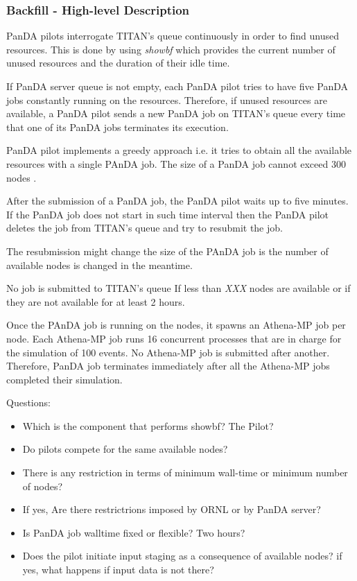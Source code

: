 \subsubsection{Backfill - High-level Description}
PanDA pilots  interrogate TITAN's queue continuously in order to find unused resources. This is done by using \emph{showbf} which provides the current number of unused resources and the duration of their idle time.

If PanDA server queue is not empty, each PanDA pilot tries to have five PanDA jobs constantly running on the resources. Therefore, if unused resources are available, a PanDA pilot sends a new PanDA job on TITAN's queue every time that one of its PanDA jobs terminates its execution.

PanDA pilot implements a greedy approach i.e. it tries to obtain all the available resources with a single PAnDA job. The size of a PanDA job cannot exceed 300 nodes .

After the submission of a PanDA job,  the PanDA pilot waits up to five minutes. If the PanDA job does not start in such time interval then the PanDA pilot deletes the job from TITAN's queue and try to resubmit the job.

The resubmission might change the size of the PAnDA job is the number of available nodes is changed in the meantime.

No job is submitted to TITAN's queue If less than \emph{XXX} nodes are available or if they are not  available for at least 2 hours.

Once the PAnDA job is running on the nodes, it spawns an Athena-MP job per node. Each Athena-MP job runs 16 concurrent processes that are in charge for the simulation of 100 events. No Athena-MP job is submitted after another. Therefore, PanDA job terminates immediately after all the Athena-MP jobs completed their simulation.



Questions:
\begin{itemize}
\item Which is the component that performs showbf? The Pilot?
\item Do pilots compete for the same available nodes?
\item There is any restriction in terms of minimum wall-time or minimum number of nodes?
\item If yes, Are there restrictrions imposed by ORNL or by PanDA server?
\item Is PanDA job walltime fixed or flexible? Two hours?
\item Does the pilot initiate input staging as a consequence of available nodes? if yes, what happens if input data is not there?
\end{itemize}
